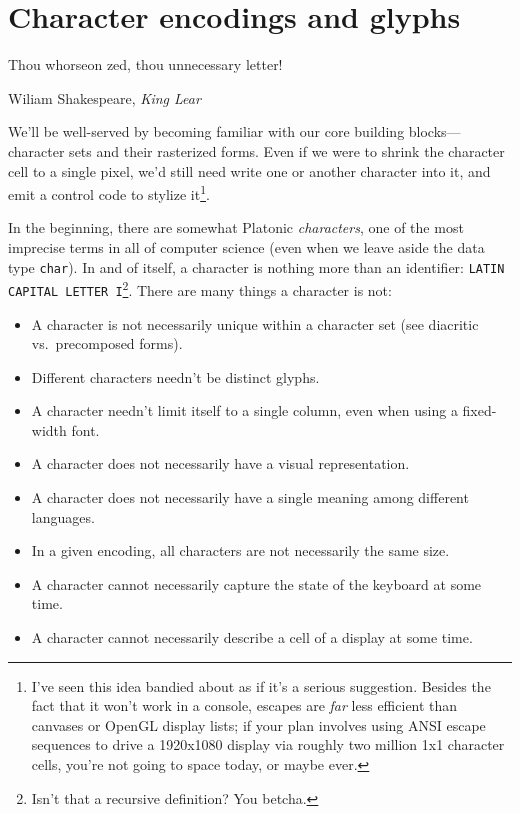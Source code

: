 \documentclass[letterpaper,10pt]{article}
\newenvironment{denseitemize}{
  \begin{itemize}
      \setlength{\itemsep}{0pt}
}{
  \end{itemize}
}
\begin{document}
\section{Character encodings and glyphs}\label{section:unicode}
\label{sec:charsets}
\epigraph{Thou whorseon zed, thou unnecessary letter!}{Wiliam Shakespeare, \textit{King Lear}}

We'll be well-served by becoming familiar with our core building
blocks---character sets and their rasterized forms. Even if we were to shrink
the character cell to a single pixel, we'd still need write one or another
character into it, and emit a control code to stylize it\footnote{I've seen
this idea bandied about as if it's a serious suggestion. Besides the fact
that it won't work in a console, escapes are \textit{far} less efficient than
canvases or OpenGL display lists; if your plan involves using ANSI escape
sequences to drive a 1920x1080 display via roughly two million 1x1 character
cells, you're not going to space today, or maybe ever\cite{upgoerfive}.}.

In the beginning, there are somewhat Platonic \textit{characters}, one of the
most imprecise terms in all of computer science (even when we leave aside the
data type \texttt{char}). In and of itself, a character is nothing more than an
identifier: \texttt{LATIN CAPITAL LETTER I}\footnote{Isn't that a recursive
definition? You betcha.}. There are many things a character is not:

\begin{denseitemize}
\item{A character is not necessarily unique within a character set (see diacritic vs.\ precomposed forms).}
\item{Different characters needn't be distinct glyphs\cite{nothinggoesaway}.}
\item{A character needn't limit itself to a single column, even when using a fixed-width font.}
\item{A character does not necessarily have a visual representation.}
\item{A character does not necessarily have a single meaning among different languages.}
\item{In a given encoding, all characters are not necessarily the same size.}
\item{A character cannot necessarily capture the state of the keyboard at some time.}
\item{A character cannot necessarily describe a cell of a display at some time.}
\end{denseitemize}
\end{document}

